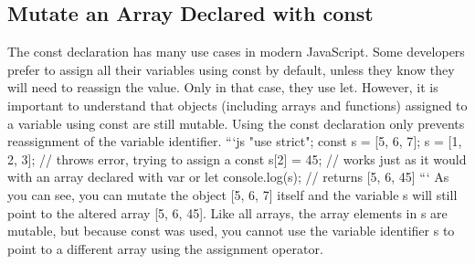 \documentclass{article}%
\begin{document}
\subsection{Mutate an Array Declared with const}%
\label{subsec:MutateanArrayDeclaredwithconst}%
The const declaration has many use cases in modern JavaScript.\newline%
Some developers prefer to assign all their variables using const by default, unless they know they will need to reassign the value. Only in that case, they use let.\newline%
However, it is important to understand that objects (including arrays and functions) assigned to a variable using const are still mutable. Using the const declaration only prevents reassignment of the variable identifier.\newline%
```js\newline%
"use strict";\newline%
const s = {[}5, 6, 7{]};\newline%
s = {[}1, 2, 3{]}; // throws error, trying to assign a const\newline%
s{[}2{]} = 45; // works just as it would with an array declared with var or let\newline%
console.log(s); // returns {[}5, 6, 45{]}\newline%
```\newline%
As you can see, you can mutate the object {[}5, 6, 7{]} itself and the variable s will still point to the altered array {[}5, 6, 45{]}. Like all arrays, the array elements in s are mutable, but because const was used, you cannot use the variable identifier s to point to a different array using the assignment operator.\newline%

%
\end{document}
